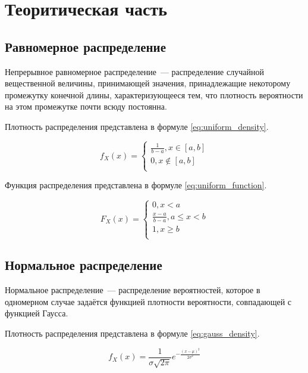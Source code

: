\chapter{Теоритическая часть}%

\section{Равномерное распределение}

Непрерывное равномерное распределение~--- распределение случайной вещественной величины, принимающей значения, принадлежащие некоторому промежутку конечной длины, характеризующееся тем, что плотность вероятности на этом промежутке почти всюду постоянна.

Плотность распределения представлена в формуле \ref{eq:uniform_density}.

\begin{equation}\label{eq:uniform_density}
    f_X (x) =
    \begin{cases}
        \frac{1}{b-a}, x \in [a,b] \\
        0, x \notin [a, b] \\
    \end{cases}
\end{equation}

Функция распределения представлена в формуле \ref{eq:uniform_function}.

\begin{equation}\label{eq:uniform_function}
    F_X (x) =
    \begin{cases}
        0, x < a \\
        \frac{x - a}{b - a}, a \le x < b \\
        1, x \geq b \\
    \end{cases}
\end{equation}

\section{Нормальное распределение}

Нормальное распределение~--- распределение вероятностей, которое в одномерном случае задаётся функцией плотности вероятности, совпадающей с функцией Гаусса.

Плотность распределения представлена в формуле \ref{eq:gauss_density}.

\begin{equation}\label{eq:gauss_density}
    f_X (x) = \frac{1}{\sigma \sqrt{2 \pi}} e^{-\frac{(x - \mu)^2}{2 \sigma^2}}
\end{equation}

